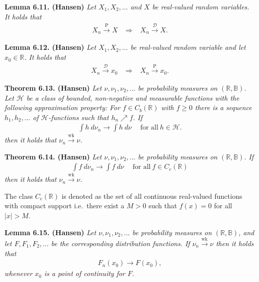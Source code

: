 \documentclass[a4paper,10pt,openany]{book}
\begin{document}
\textbf{Lemma 6.11. (Hansen)} \emph{Let \(X_1,X_2,...\) and \(X\) be real-valued random variables. It holds that}
\begin{align*}
    X_n\stackrel{\text{P}}{\to} X\hspace{10pt}\Rightarrow\hspace{10pt} X_n\stackrel{\mathcal{D}}{\to} X.
\end{align*}

\textbf{Lemma 6.12. (Hansen)} \emph{Let \(X_1,X_2,...\) be real-valued random variable and let \(x_0\in\mathbb{R}\). It holds that}
\begin{align*}
    X_n\stackrel{\mathcal{D}}{\to} x_0\hspace{10pt}\Rightarrow\hspace{10pt} X_n\stackrel{\text{P}}{\to} x_0.
\end{align*}

\textbf{Theorem 6.13. (Hansen)} \emph{Let \(\nu,\nu_1,\nu_2,...\) be probability measures on \((\mathbb{R},\mathbb{B})\). Let \(\mathcal{H}\) be a class of bounded, non-negative and measurable functions with the following approximation property: For \(f\in C_b(\mathbb{R})\) with \(f\ge 0\) there is a sequence \(h_1,h_2,...\) of \(\mathcal{H}\)-functions such that \(h_n\nearrow f\). If}
\begin{align*}
    \int h\ d\nu_n\to \int h\ d\nu\hspace{15pt}\text{for all}\ h\in\mathcal{H}.\tag{6.11}
\end{align*}
\emph{then it holds that \(\nu_n\stackrel{\text{wk}}{\to} \nu\).}

\textbf{Theorem 6.14. (Hansen)} \emph{Let \(\nu,\nu_1,\nu_2,...\) be probability measures on \((\mathbb{R},\mathbb{B})\). If}
\begin{align*}
    \int f\ d\nu_n\to \int f\ d\nu\hspace{15pt}\text{for all}\ f\in C_c(\mathbb{R})\tag{6.13}
\end{align*}
\emph{then it holds that \(\nu_n\stackrel{\text{wk}}{\to} \nu\).}

The class \(C_c(\mathbb{R})\) is denoted as the set of all continuous real-valued functions with compact support i.e.~there exist a \(M>0\) such that \(f(x)=0\) for all \(\vert x\vert>M\).

\textbf{Lemma 6.15. (Hansen)} \emph{Let \(\nu,\nu_1,\nu_2,...\) be probability measures on \((\mathbb{R},\mathbb{B})\), and let \(F,F_1,F_2,...\) be the corresponding distribution functions. If \(\nu_n\stackrel{\text{wk}}{\to}\nu\) then it holds that}
\begin{align*}
    F_n(x_0)\to F(x_0),
\end{align*}
\emph{whenever \(x_0\) is a point of continuity for \(F\).}
\end{document}
